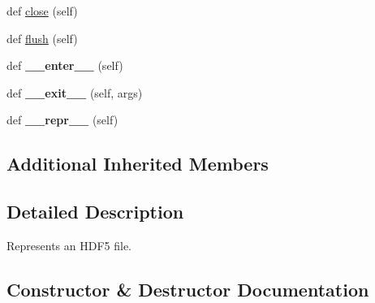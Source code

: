 \begin{DoxyCompactItemize}
\item 
def \hyperlink{classh5py__LOCAL_1_1__hl_1_1files_1_1File_a61915f9d434c0edf75119f6e8f11b795}{close} (self)
\item 
def \hyperlink{classh5py__LOCAL_1_1__hl_1_1files_1_1File_a2bc75c4416dee73f9c60a6bedaffe844}{flush} (self)
\item 
\mbox{\label{classh5py__LOCAL_1_1__hl_1_1files_1_1File_a6b76d1ba58560be8f4ebc2ab4762c7fa}} 
def {\bfseries \+\_\+\+\_\+enter\+\_\+\+\_\+} (self)
\item 
\mbox{\label{classh5py__LOCAL_1_1__hl_1_1files_1_1File_a500f881c1e4846b20b06e35bca655c74}} 
def {\bfseries \+\_\+\+\_\+exit\+\_\+\+\_\+} (self, args)
\item 
\mbox{\label{classh5py__LOCAL_1_1__hl_1_1files_1_1File_ae8878e650350b8c11471419ab8b58a6c}} 
def {\bfseries \+\_\+\+\_\+repr\+\_\+\+\_\+} (self)
\end{DoxyCompactItemize}
\subsection*{Additional Inherited Members}


\subsection{Detailed Description}
\begin{DoxyVerb}    Represents an HDF5 file.
\end{DoxyVerb}
 

\subsection{Constructor \& Destructor Documentation}
\mbox{\label{classh5py__LOCAL_1_1__hl_1_1files_1_1File_a78155dd2356e91286c9222b26f24c53b}} 
